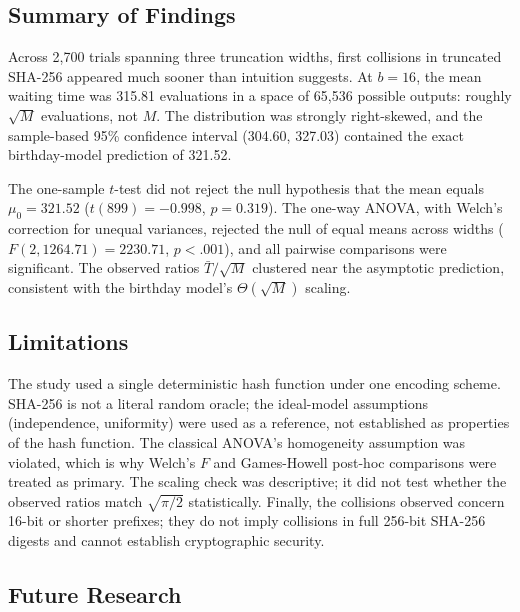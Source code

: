 \documentclass[12pt,letterpaper]{article}
\begin{document}
\subsection{Summary of Findings}

Across 2{,}700 trials spanning three truncation widths, first collisions in truncated SHA-256 appeared much sooner than intuition suggests. At $b=16$, the mean waiting time was 315.81 evaluations in a space of 65{,}536 possible outputs: roughly $\sqrt{M}$ evaluations, not $M$. The distribution was strongly right-skewed, and the sample-based 95\% confidence interval (304.60, 327.03) contained the exact birthday-model prediction of 321.52.

The one-sample \(t\)-test did not reject the null hypothesis that the mean equals $\mu_0 = 321.52$ ($t(899) = -0.998$, $p = 0.319$). The one-way ANOVA, with Welch's correction for unequal variances, rejected the null of equal means across widths ($F(2, 1264.71) = 2230.71$, $p < .001$), and all pairwise comparisons were significant. The observed ratios $\bar{T}/\sqrt{M}$ clustered near the asymptotic prediction, consistent with the birthday model's $\Theta(\sqrt{M})$ scaling.

\subsection{Limitations}

The study used a single deterministic hash function under one encoding scheme. SHA-256 is not a literal random oracle; the ideal-model assumptions (independence, uniformity) were used as a reference, not established as properties of the hash function. The classical ANOVA's homogeneity assumption was violated, which is why Welch's $F$ and Games-Howell post-hoc comparisons were treated as primary. The scaling check was descriptive; it did not test whether the observed ratios match $\sqrt{\pi/2}$ statistically. Finally, the collisions observed concern 16-bit or shorter prefixes; they do not imply collisions in full 256-bit SHA-256 digests and cannot establish cryptographic security.

\subsection{Future Research}
\end{document}
